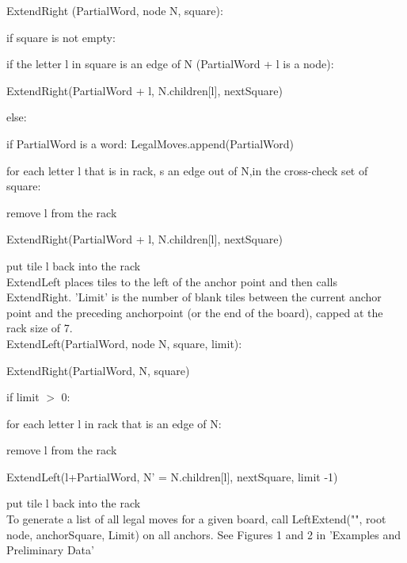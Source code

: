 \documentclass[12pt]{article}
\begin{document}
\quad ExtendRight (PartialWord, node N, square):

\quad\quad if square is not empty:

\quad\quad\quad if the letter l in square is an edge of N (PartialWord + l is a node):

\quad\quad\quad\quad ExtendRight(PartialWord + l, N.children[l], nextSquare)

\quad\quad else:

\quad\quad\quad if PartialWord is a word: LegalMoves.append(PartialWord)

\quad\quad\quad for each letter l that is in rack, s an edge out of N,in the cross-check set of square:

\quad\quad\quad\quad\quad remove l from the rack

\quad\quad\quad\quad\quad ExtendRight(PartialWord + l, N.children[l], nextSquare)

\quad\quad\quad\quad\quad put tile l back into the rack\\


ExtendLeft places tiles to the left
of the anchor point and then calls ExtendRight. 'Limit' is the number of blank tiles
between the current anchor point and the preceding anchorpoint (or the end of the board), capped at the rack size of 7.\\

\quad ExtendLeft(PartialWord, node N, square, limit):

\quad\quad ExtendRight(PartialWord, N, square)

\quad\quad if limit $>$ 0: 

\quad\quad\quad for each letter l in rack that is an edge of N: 

\quad\quad\quad\quad remove l from the rack

\quad\quad\quad\quad ExtendLeft(l+PartialWord, N' =
N.children[l], nextSquare, limit -1)

\quad\quad\quad\quad put tile l back into the rack\\
			
To generate a list of all legal moves for a given board, call
LeftExtend("", root node, anchorSquare, Limit) on all anchors. See
Figures 1 and 2 in 'Examples and Preliminary Data'

\end{document}
